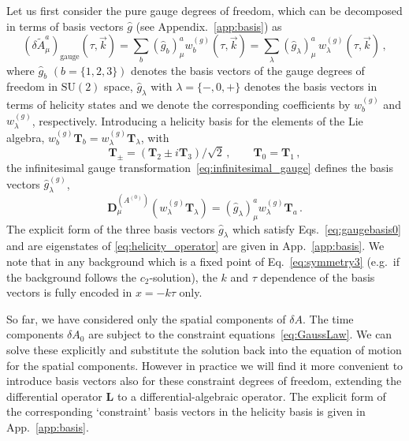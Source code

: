 Let us first consider the pure gauge degrees of freedom, which can be decomposed in terms of  basis vectors $\hat g$  (see Appendix.~\ref{app:basis}) as 
\begin{equation}
 (\delta \tilde{A}^a_\mu)_\text{gauge}(\tau, \vec k) = \sum_b (\hat g_b)^a_\mu w_b^{(g)}(\tau, \vec k) 
 =  \sum_{\lambda}( \hat g_\lambda)^a_\mu \, w^{(g)}_\lambda(\tau, \vec k)\,,
\end{equation}
where $\hat g_b$ $(b = \{1,2,3\})$ denotes the basis vectors of the gauge degrees of freedom in $\mathrm{SU}(2)$ space, $\hat g_\lambda$ with $\lambda = \{-,0,+\}$ denotes the basis vectors in terms of helicity states and we denote the corresponding coefficients by $w_{b}^{(g)}$ and $w_{\lambda}^{(g)}$,
respectively. Introducing a helicity basis for the elements of the Lie algebra, $w_b^{(g)} \mathbf{T}_b = w_\lambda^{(g)} \mathbf{T}_\lambda$, with
\begin{equation}
 \mathbf{T}_\pm =  (\mathbf{T}_2 \pm i \mathbf{T}_3)/\sqrt{2} \,, \qquad  \mathbf{T}_0 = \mathbf{T}_1 \,,
\end{equation}
the infinitesimal gauge transformation~\eqref{eq:infinitesimal_gauge}  defines the basis vectors $\hat g^{(g)}_\lambda$,
\begin{equation}
 \mathbf{D}_{\mu}^{(A^{(0)})} \left( w_\lambda^{(g)} \mathbf{T}_\lambda \right) = (\hat g_\lambda)^a_\mu w_\lambda^{(g)} \mathbf{T}_a \,.
 \label{eq:gaugebasis0}
\end{equation}
The explicit form of the three basis vectors $\hat g_\lambda$ which satisfy Eqs.~\eqref{eq:gaugebasis0} and are eigenstates of \eqref{eq:helicity_operator} are given in App.~\ref{app:basis}. We note that in  any background which is a fixed point of Eq.~\eqref{eq:symmetry3} (e.g.\ if the background follows the $c_2$-solution), the $k$ and $\tau$ dependence of the basis vectors is fully encoded in $x = - k \tau$ only.



So far, we have considered only the spatial components of $\delta A$. The time components $\delta A_0$ are subject to the constraint equations~\eqref{eq:GaussLaw}. We can solve these explicitly and substitute the solution back into the equation of motion for the spatial components. 
However in practice we will find it more convenient to introduce basis vectors also for these constraint degrees of freedom, extending the differential operator $\mathbf L$ to a differential-algebraic operator. The explicit form of the  corresponding `constraint' basis vectors in the helicity basis is given in App.~\ref{app:basis}.



